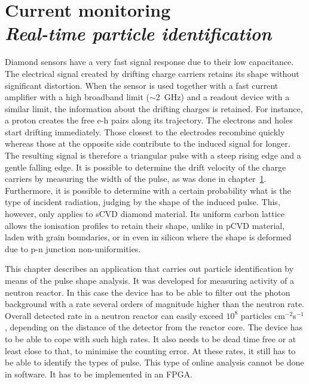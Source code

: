 \documentclass[12pt]{packages/mytustyle}  %
\newcommand\Chapter[2]{\chapter
  [#1\hfil\hbox{}\protect\linebreak{\itshape#2}]%
  {#1\\[2ex]\Large\itshape#2}%
}
\begin{document}
\baselineskip=15pt

\tableofcontents

\Chapter{Current monitoring}{Real-time particle identification}

Diamond sensors have a very fast signal response due to their low capacitance. The electrical signal created by drifting charge carriers retains its shape without significant distortion. When the sensor is used together with a fast current amplifier with a high broadband limit ($\sim$2~GHz) and a readout device with a similar limit, the information about the drifting charges is retained. For instance, a proton creates the free e-h pairs along its trajectory. The electrons and holes start drifting immediately. Those closest to the electrodes recombine quickly whereas those at the opposite side contribute to the induced signal for longer.  The resulting signal is therefore a triangular pulse with a steep rising edge and a gentle falling edge. It is possible to determine the drift velocity of the charge carriers by measuring the width of the pulse, as was done in chapter~\ref{}. Furthermore, it is possible to determine with a certain probability what is the type of incident radiation, judging by the shape of the induced pulse. This, however, only applies to sCVD diamond material. Its uniform carbon lattice allows the ionisation profiles to retain their shape, unlike in pCVD material, laden with grain boundaries, or in even in silicon where the shape is deformed due to p-n junction non-uniformities.

This chapter describes an application that carries out particle identification by means of the pulse shape analysis. It was developed for measuring activity of a neutron reactor. In this case the device has to be able to filter out the photon background with a rate several orders of magnitude higher than the neutron rate. Overall detected rate in a neutron reactor can easily exceed $10^8$ particles cm$^{-2}$s$^{-1}$, depending on the distance of the detector from the reactor core. The device has to be able to cope with such high rates. It also needs to be dead time free or at least close to that, to minimise the counting error. At these rates, it still has to be able to identify the types of pulse. This type of online analysis cannot be done in software. It has to be implemented in an FPGA.
\end{document}
